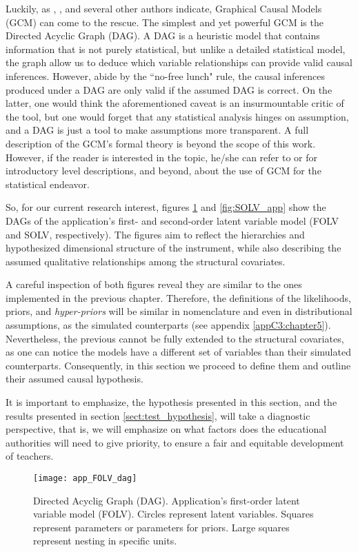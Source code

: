 Luckily, as \citet{McElreath_2020}, \citet{Hernan_et_al_2020}, and several other authors indicate, Graphical Causal Models (GCM) can come to the rescue. The simplest and yet powerful GCM is the Directed Acyclic Graph (DAG). A DAG is a heuristic model that contains information that is not purely statistical, but unlike a detailed statistical model, the graph allow us to deduce which variable relationships can provide valid causal inferences. However, abide by the ``no-free lunch" rule, the causal inferences produced under a DAG are only valid if the assumed DAG is correct. On the latter, one would think the aforementioned caveat is an insurmountable critic of the tool, but one would forget that any statistical analysis hinges on assumption, and a DAG is just a tool to make assumptions more transparent. A full description of the GCM's formal theory is beyond the scope of this work. However, if the reader is interested in the topic, he/she can refer to \citet{McElreath_2020} or  \citet{Hernan_et_al_2020} for introductory level descriptions, and beyond, about the use of GCM for the statistical endeavor.

So, for our current research interest, figures \ref{fig:FOLV_app} and \ref{fig:SOLV_app} show the DAGs of the application's first- and second-order latent variable model (FOLV and SOLV, respectively). The figures aim to reflect the hierarchies and hypothesized dimensional structure of the instrument, while also describing the assumed qualitative relationships among the structural covariates. 

A careful inspection of both figures reveal they are similar to the ones implemented in the previous chapter. Therefore, the definitions of the likelihoods, priors, and \textit{hyper-priors} will be similar in nomenclature and even in distributional assumptions, as the simulated counterparts (see appendix \ref{appC3:chapter5}). Nevertheless, the previous cannot be fully extended to the structural covariates, as one can notice the models have a different set of variables than their simulated counterparts. Consequently, in this section we proceed to define them and outline their assumed causal hypothesis.

It is important to emphasize, the hypothesis presented in this section, and the results presented in section \ref{sect:test_hypothesis}, will take a diagnostic perspective, that is, we will emphasize on what factors does the educational authorities will need to give priority, to ensure a fair and equitable development of teachers.
%
\begin{figure}[H]
	\centering
	\texttt{[image: app\_FOLV\_dag]}
	\caption[Directed Acyclic Graph (DAG). Application's first-order latent variable model (FOLV).]%
	{Directed Acyclig Graph (DAG). Application's first-order latent variable model (FOLV). Circles represent latent variables. Squares represent parameters or parameters for priors. Large squares represent nesting in specific units.}
	\label{fig:FOLV_app}
\end{figure}

